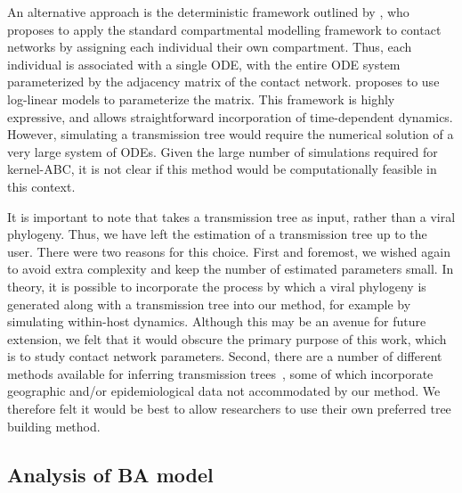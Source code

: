 An alternative approach is the deterministic framework outlined by
\textcite{morris1993epidemiology}, who proposes to apply the standard
compartmental modelling framework to contact networks by assigning each
individual their own compartment. Thus, each individual is associated with a
single \gls{ODE}, with the entire \gls{ODE} system parameterized by the
adjacency matrix of the contact network. \citeauthor{morris1993epidemiology}
proposes to use log-linear models to parameterize the matrix. This framework is
highly expressive, and allows straightforward incorporation of time-dependent
dynamics. However, simulating a transmission tree would require the numerical
solution of a very large system of \glspl{ODE}. Given the large number of
simulations required for kernel-\gls{ABC}, it is not clear if this method would
be computationally feasible in this context.

It is important to note that  takes a transmission tree as
input, rather than a viral phylogeny. Thus, we have left the estimation of a
transmission tree up to the user. There were two reasons for this choice. First
and foremost, we wished again to avoid extra complexity and keep the number of
estimated parameters small. In theory, it is possible to incorporate the
process by which a viral phylogeny is generated along with a transmission tree
into our method, for example by simulating within-host dynamics. Although this
may be an avenue for future extension, we felt that it would obscure the
primary purpose of this work, which is to study contact network parameters.
Second, there are a number of different methods available for inferring
transmission trees~\autocite{didelot2014bayesian, ypma2012unravelling,
jombart2011reconstructing, cottam2008integrating, poon2015phylodynamic}, some
of which incorporate geographic and/or epidemiological data not accommodated by
our method. We therefore felt it would be best to allow researchers to use
their own preferred tree building method.


\subsection{Analysis of \acrlong{BA} model}

